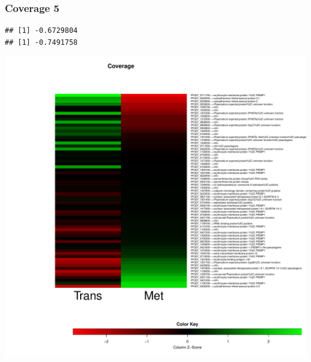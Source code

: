 \documentclass{article}\usepackage[]{graphicx}\usepackage[]{color}
\makeatletter
\newenvironment{kframe}{%
 \def\at@end@of@kframe{}%
 \ifinner\ifhmode%
  \def\at@end@of@kframe{\end{minipage}}%
  \begin{minipage}{\columnwidth}%
 \fi\fi%
 \def\FrameCommand##1{\hskip\@totalleftmargin \hskip-\fboxsep
 \colorbox{shadecolor}{##1}\hskip-\fboxsep
     \hskip-\linewidth \hskip-\@totalleftmargin \hskip\columnwidth}%
 \MakeFramed {\advance\hsize-\width
   \@totalleftmargin\z@ \linewidth\hsize
   \@setminipage}}%
 {\par\unskip\endMakeFramed%
 \at@end@of@kframe}
\newenvironment{knitrout}{}{} %
\makeatother
\begin{document}
\subsubsection{Coverage 5}
\begin{knitrout}
\color{fgcolor}\begin{kframe}
\begin{verbatim}
## [1] -0.6729804
## [1] -0.7491758
\end{verbatim}
\end{kframe}

{\centering \includegraphics[width=.9\linewidth]{figure/minimal-met_cov_5-1} 

}



\end{knitrout}
\clearpage
\end{document}
